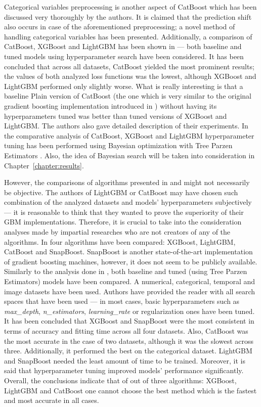 \documentclass[magisterska, english]{pwr_wmat_praca_dyplomowa}
\theoremstyle{plain}
\numberwithin{theorem}{chapter}
\theoremstyle{definition}
\numberwithin{theorem}{chapter}
\begin{document}
Categorical variables preprocessing is another aspect of CatBoost which has been discussed very thoroughly by the authors. It is claimed that the prediction shift also occurs in case of the aforementioned preprocessing; a novel method of handling categorical variables has been presented. Additionally, a comparison of CatBoost, XGBoost and LightGBM has been shown in \cite{catboost} --- both baseline and tuned models using hyperparameter search have been considered. It has been concluded that across all datasets, CatBoost yielded the most prominent results; the values of both analyzed loss functions was the lowest, although XGBoost and LightGBM performed only slightly worse. What is really interesting is that a baseline Plain version of CatBoost (the one which is very similar to the original gradient boosting implementation introduced in \cite{friedman_gbm}) without having its hyperparameters tuned was better than tuned versions of XGBoost and LightGBM.
The authors also gave detailed description of their experiments. In the comparative analysis of CatBoost, XGBoost and LightGBM hyperparameter tuning has been performed using Bayesian optimization with Tree Parzen Estimators \cite{tpe}. Also, the idea of Bayesian search will be taken into consideration in Chapter~\ref{chapter:results}.

However, the comparisons of algorithms presented in \cite{lightgbm} and \cite{catboost} might not necessarily be objective. The authors of LightGBM or CatBoost may have chosen such combination of the analyzed datasets and models' hyperparameters subjectively --- it is reasonable to think that they wanted to prove the superiority of their GBM implementations. Therefore, it is crucial to take into the consideration analyses made by impartial researches who are not creators of any of the algorithms. In \cite{competitive_analysis} four algorithms have been compared: XGBoost, LightGBM, CatBoost and SnapBoost. SnapBoost is another state-of-the-art implementation of gradient boosting machines, however, it does not seem to be publicly available. Similarly to the analysis done in \cite{catboost}, both baseline and tuned (using Tree Parzen Estimators) models have been compared. A numerical, categorical, temporal and image datasets have been used. Authors have provided the reader with all search spaces that have been used --- in most cases, basic hyperparameters such as \emph{max\_depth}, \emph{n\_estimators}, \emph{learning\_rate} or regularization ones have been tuned. It has been concluded that XGBoost and SnapBoost were the most consistent in terms of accuracy and fitting time across all four datasets. Also, CatBoost was the most accurate in the case of two datasets, although it was the slowest across three. Additionally, it performed the best on the categorical dataset. LightGBM and SnapBoost needed the least amount of time to be trained. Moreover, it is said that hyperparameter tuning improved models' performance significantly. Overall, the conclusions indicate that of out of three algorithms: XGBoost, LightGBM and CatBoost one cannot choose the best method which is the fastest and most accurate in all cases.
\end{document}
